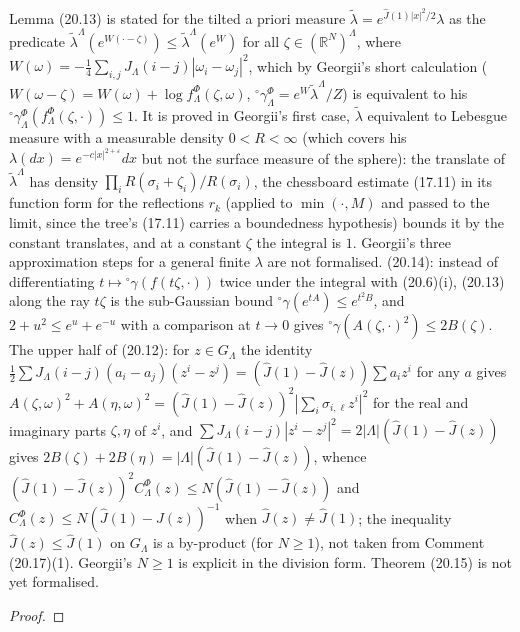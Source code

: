 \begin{theorem}
    Lemma (20.13) is stated for the tilted a priori measure $\tilde\lambda = e^{\hat J(1)|x|^2/2}\lambda$
    as the predicate $\tilde\lambda^\Lambda(e^{W(\cdot-\zeta)}) \leq \tilde\lambda^\Lambda(e^W)$ for all
    $\zeta \in (\mathbb R^N)^\Lambda$, where $W(\omega) = -\frac14\sum_{i,j}J_\Lambda(i-j)|\omega_i-\omega_j|^2$,
    which by Georgii's short calculation ($W(\omega-\zeta) = W(\omega) + \log f^\Phi_\Lambda(\zeta,\omega)$,
    ${}^\circ\gamma^\Phi_\Lambda = e^W\tilde\lambda^\Lambda/Z$) is equivalent to his
    ${}^\circ\gamma^\Phi_\Lambda(f^\Phi_\Lambda(\zeta,\cdot)) \leq 1$. It is proved in Georgii's first
    case, $\tilde\lambda$ equivalent to Lebesgue measure with a measurable density $0 < R < \infty$
    (which covers his $\lambda(dx) = e^{-c|x|^{2+\varepsilon}}dx$ but not the surface measure of the
    sphere): the translate of $\tilde\lambda^\Lambda$ has density $\prod_i R(\sigma_i+\zeta_i)/R(\sigma_i)$,
    the chessboard estimate (17.11) in its function form for the reflections $r_k$ (applied to
    $\min(\cdot, M)$ and passed to the limit, since the tree's (17.11) carries a boundedness
    hypothesis) bounds it by the constant translates, and at a constant $\zeta$ the integral is $1$.
    Georgii's three approximation steps for a general finite $\lambda$ are not formalised.
    (20.14): instead of differentiating $t \mapsto {}^\circ\gamma(f(t\zeta,\cdot))$ twice under the
    integral with (20.6)(i), (20.13) along the ray $t\zeta$ is the sub-Gaussian bound
    ${}^\circ\gamma(e^{tA}) \leq e^{t^2B}$, and $2 + u^2 \leq e^u + e^{-u}$ with a comparison at
    $t \to 0$ gives ${}^\circ\gamma(A(\zeta,\cdot)^2) \leq 2B(\zeta)$. The upper half of (20.12): for
    $z \in G_\Lambda$ the identity $\frac12\sum J_\Lambda(i-j)(a_i-a_j)(z^i-z^j) = (\hat J(1)-\hat J(z))
    \sum a_i z^i$ for any $a$ gives $A(\zeta,\omega)^2 + A(\eta,\omega)^2 = (\hat J(1)-\hat J(z))^2
    |\sum_i\sigma_{i,\ell}z^i|^2$ for the real and imaginary parts $\zeta, \eta$ of $z^i$, and
    $\sum J_\Lambda(i-j)|z^i-z^j|^2 = 2|\Lambda|(\hat J(1)-\hat J(z))$ gives $2B(\zeta)+2B(\eta) =
    |\Lambda|(\hat J(1)-\hat J(z))$, whence $(\hat J(1)-\hat J(z))^2 C^\Phi_\Lambda(z) \leq
    N(\hat J(1)-\hat J(z))$ and $C^\Phi_\Lambda(z) \leq N(\hat J(1)-\hat J(z))^{-1}$ when $\hat J(z)
    \neq \hat J(1)$; the inequality $\hat J(z) \leq \hat J(1)$ on $G_\Lambda$ is a by-product (for
    $N \geq 1$), not taken from Comment (20.17)(1). Georgii's $N \geq 1$ is explicit in the division
    form. Theorem (20.15) is not yet formalised.
\end{theorem}
\begin{proof}
    \leanok
\end{proof}
